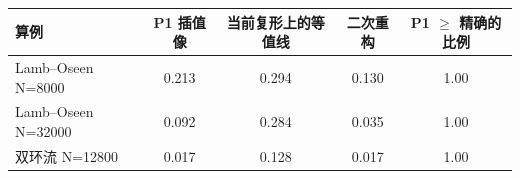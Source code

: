 \begin{tabular}{lcccc}\toprule 算例 & P1 插值像 & 当前复形上的等值线 & 二次重构 & P1 $\ge$ 精确的比例\\\midrule
Lamb–Oseen N=8000 & 0.213 & 0.294 & 0.130 & 1.00\\
Lamb–Oseen N=32000 & 0.092 & 0.284 & 0.035 & 1.00\\
双环流 N=12800 & 0.017 & 0.128 & 0.017 & 1.00\\
\bottomrule\end{tabular}